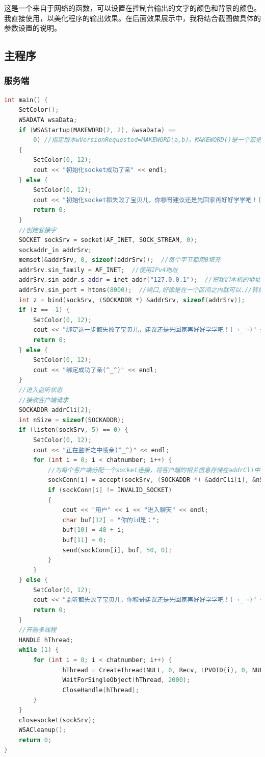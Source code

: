 \documentclass[UTF8,a4paper,10pt]{ctexart}
\begin{document}
这是一个来自于网络的函数，可以设置在控制台输出的文字的颜色和背景的颜色。我直接使用，以美化程序的输出效果。在后面效果展示中，我将结合截图做具体的参数设置的说明。

\subsection{主程序}
\subsubsection{服务端}
\begin{lstlisting}[frame=trbl,language={C++}]
int main() {
    SetColor();
    WSADATA wsaData;
    if (WSAStartup(MAKEWORD(2, 2), &wsaData) ==
        0) //指定版本wVersionRequested=MAKEWORD(a,b)。MAKEWORD()是一个宏把两个数字组合成一个WORD，无符号的短整型
    {
        SetColor(0, 12);
        cout << "初始化socket成功了亲" << endl;
    } else {
        SetColor(0, 12);
        cout << "初始化socket都失败了宝贝儿，你穆哥建议还是先回家再好好学学吧！(￢_￢)" << endl;
        return 0;
    }
    //创建套接字
    SOCKET sockSrv = socket(AF_INET, SOCK_STREAM, 0);
    sockaddr_in addrSrv;
    memset(&addrSrv, 0, sizeof(addrSrv));  //每个字节都用0填充
    addrSrv.sin_family = AF_INET;  //使用IPv4地址
    addrSrv.sin_addr.s_addr = inet_addr("127.0.0.1");  //把我们本机的地址转换成网络字节二进制值序
    addrSrv.sin_port = htons(8000);  //端口,好像是在一个区间之内就可以.//转换函数，也是转换成网络字节序
    int z = bind(sockSrv, (SOCKADDR *) &addrSrv, sizeof(addrSrv));
    if (z == -1) {
        SetColor(0, 12);
        cout << "绑定这一步都失败了宝贝儿，建议还是先回家再好好学学吧！(￢_￢)" << endl;
        return 0;
    } else {
        SetColor(0, 12);
        cout << "绑定成功了亲(^_^)" << endl;
    }
    //进入监听状态
    //接收客户端请求
    SOCKADDR addrCli[2];
    int nSize = sizeof(SOCKADDR);
    if (listen(sockSrv, 5) == 0) {
        SetColor(0, 12);
        cout << "正在监听之中哦亲(^_^)" << endl;
        for (int i = 0; i < chatnumber; i++) {
            //为每个客户端分配一个socket连接，将客户端的相关信息存储在addrCli中
            sockConn[i] = accept(sockSrv, (SOCKADDR *) &addrCli[i], &nSize);
            if (sockConn[i] != INVALID_SOCKET)
            {
                cout << "用户" << i << "进入聊天" << endl;
                char buf[12] = "你的id是：";
                buf[10] = 48 + i;
                buf[11] = 0;
                send(sockConn[i], buf, 50, 0);
            }
        }
    } else {
        SetColor(0, 12);
        cout << "监听都失败了宝贝儿，你穆哥建议还是先回家再好好学学吧！(￢_￢)" << endl;
        return 0;
    }
    //开启多线程
    HANDLE hThread;
    while (1) {
        for (int i = 0; i < chatnumber; i++) {
                hThread = CreateThread(NULL, 0, Recv, LPVOID(i), 0, NULL);
                WaitForSingleObject(hThread, 2000);
                CloseHandle(hThread);
        }
    }
    closesocket(sockSrv);
    WSACleanup();
    return 0;
}
\end{lstlisting}
\end{document}

